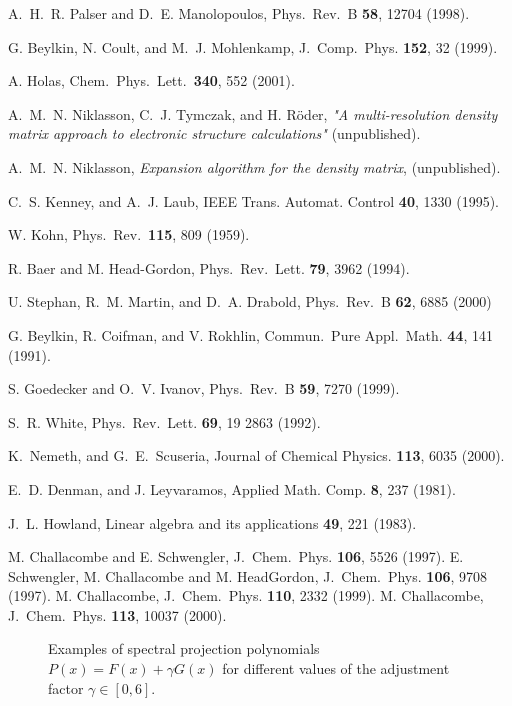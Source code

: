 \commentoutA{\documentclass[superbib,aps,prb,epsfig,floats,twocolumn]{revtex4}}
\begin{document}
\begin{references}
 A.\ H.\ R. Palser and D.\ E. Manolopoulos,
Phys.\ Rev.\ B {\bf 58}, 12704 (1998). 

 G. Beylkin, N. Coult, and M.\ J. Mohlenkamp,
J.\ Comp.\ Phys. {\bf 152}, 32 (1999).

 A. Holas, Chem.\ Phys.\ Lett.\ {\bf 340}, 552 (2001).

 A.\ M.\ N. Niklasson, C.\ J. Tymczak, and H. R\"oder,
{\it "A multi-resolution density matrix approach to electronic structure
calculations"} (unpublished).

 A.\ M.\ N. Niklasson, {\it Expansion
algorithm for the density matrix}, (unpublished).

 C.\ S. Kenney, and A.\ J. Laub,
IEEE Trans. Automat. Control {\bf 40}, 1330 (1995).

 W. Kohn,
Phys.\ Rev.\ {\bf 115}, 809 (1959).

 R. Baer and M. Head-Gordon,
Phys.\ Rev.\ Lett. {\bf 79}, 3962 (1994).

 U. Stephan, R.\ M. Martin, and D.\ A. Drabold,
Phys.\ Rev.\ B {\bf 62}, 6885 (2000)

 G. Beylkin, R. Coifman, and V. Rokhlin,
Commun.\ Pure Appl.\ Math. {\bf 44}, 141 (1991).

 S. Goedecker and O.\ V. Ivanov,
Phys.\ Rev.\ B {\bf 59}, 7270 (1999).

 S.\ R. White,
Phys.\ Rev.\ Lett. {\bf 69}, 19 2863 (1992).

 K.\ Nemeth, and G.\ E.\ Scuseria,
Journal of Chemical Physics. {\bf 113}, 6035 (2000).

 E.\ D. Denman, and J. Leyvaramos,
Applied Math. Comp. {\bf 8}, 237 (1981).

 J.\ L. Howland,
Linear algebra and its applications {\bf 49}, 221 (1983).~

 M. Challacombe and E. Schwengler,
J.\ Chem.\ Phys. {\bf 106}, 5526 (1997).
E. Schwengler, M. Challacombe and M. HeadGordon,
J.\ Chem.\ Phys. {\bf 106}, 9708 (1997).
M. Challacombe, J.\ Chem.\ Phys. {\bf 110}, 2332 (1999).
M.  Challacombe, J.\ Chem.\ Phys. {\bf 113}, 10037 (2000).


\end{references}

\begin{figure}
\caption{\small
\label{Conv}}
\end{figure}

\begin{figure}
\caption{\small 
Examples of spectral projection polynomials $P(x) = F(x) + \gamma G(x)$
for different values of the adjustment factor $\gamma \in [0,6]$.
\label{Fig_F_G}}
\end{figure}

\begin{figure}
\caption{\small
\label{ConvN}}
\end{figure}

\begin{figure}
\caption{\small
\label{Lin}}
\end{figure}
\end{document}
